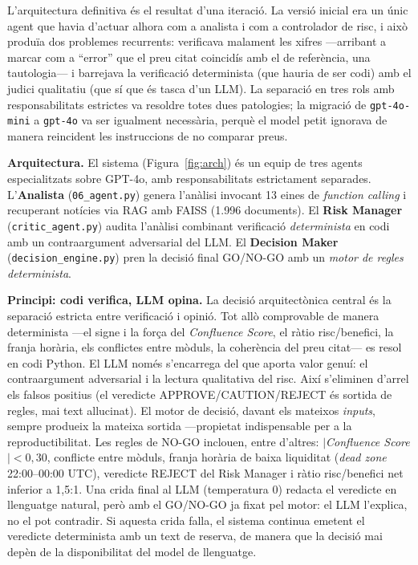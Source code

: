 \documentclass[10pt,twocolumn,a4paper]{article}
\begin{document}
L'arquitectura definitiva és el resultat d'una iteració. La versió inicial era un
únic agent que havia d'actuar alhora com a analista i com a controlador de risc, i
això produïa dos problemes recurrents: verificava malament les xifres ---arribant a
marcar com a ``error'' que el preu citat coincidís amb el de referència, una
tautologia--- i barrejava la verificació determinista (que hauria de ser codi) amb
el judici qualitatiu (que sí que és tasca d'un LLM). La separació en tres rols amb
responsabilitats estrictes va resoldre totes dues patologies; la migració de
\texttt{gpt-4o-mini} a \texttt{gpt-4o} va ser igualment necessària, perquè el model
petit ignorava de manera reincident les instruccions de no comparar preus.

\textbf{Arquitectura.} El sistema (Figura~\ref{fig:arch}) és un equip de tres
agents especialitzats sobre GPT-4o, amb responsabilitats estrictament separades.
L'\textbf{Analista} (\texttt{06\_agent.py}) genera l'anàlisi invocant 13 eines de
\textit{function calling} i recuperant notícies via RAG amb FAISS (1.996
documents). El \textbf{Risk Manager} (\texttt{critic\_agent.py}) audita l'anàlisi
combinant verificació \emph{determinista} en codi amb un contraargument
adversarial del LLM. El \textbf{Decision Maker} (\texttt{decision\_engine.py}) pren
la decisió final GO/NO-GO amb un \emph{motor de regles determinista}.

\textbf{Principi: codi verifica, LLM opina.} La decisió arquitectònica central és
la separació estricta entre verificació i opinió. Tot allò comprovable de manera
determinista ---el signe i la força del \textit{Confluence Score}, el ràtio
risc/benefici, la franja horària, els conflictes entre mòduls, la coherència del
preu citat--- es resol en codi Python. El LLM només s'encarrega del que aporta
valor genuí: el contraargument adversarial i la lectura qualitativa del risc. Així
s'eliminen d'arrel els falsos positius (el veredicte APPROVE/CAUTION/REJECT és
sortida de regles, mai text al\textperiodcentered{}lucinat). El motor de decisió,
davant els mateixos \textit{inputs}, sempre produeix la mateixa sortida ---propietat
indispensable per a la reproductibilitat. Les regles de NO-GO inclouen,
entre d'altres: $|$\textit{Confluence Score}$| < 0{,}30$, conflicte entre mòduls,
franja horària de baixa liquiditat (\textit{dead zone} 22:00--00:00 UTC), veredicte
REJECT del Risk Manager i ràtio risc/benefici net inferior a 1,5:1. Una crida final
al LLM (temperatura 0) redacta el veredicte en llenguatge natural, però amb el
GO/NO-GO ja fixat pel motor: el LLM l'explica, no el pot contradir. Si aquesta crida
falla, el sistema continua emetent el veredicte determinista amb un text de reserva,
de manera que la decisió mai depèn de la disponibilitat del model de llenguatge.
\end{document}
